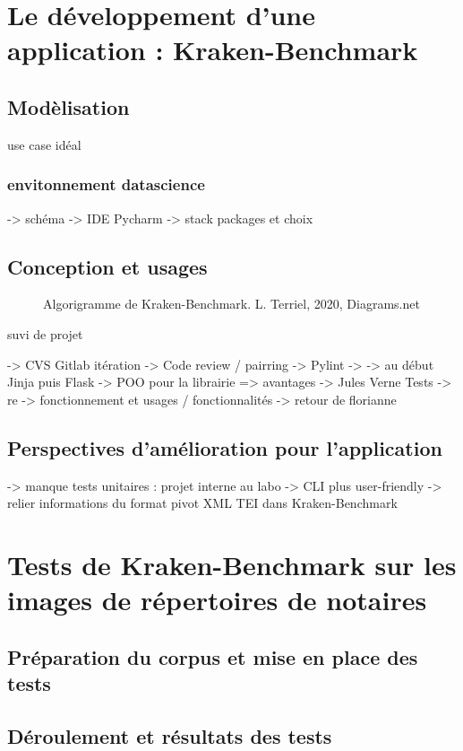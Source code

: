 \chapter{Le développement d'une application : Kraken-Benchmark}

\section{Modèlisation}

use case idéal

\subsection{envitonnement datascience}
-> schéma
-> IDE Pycharm
-> stack packages et choix

\section{Conception et usages}

\newpage
\begin{figure}
    \centering
    \centerline{}
    \caption{Algorigramme de Kraken-Benchmark.   \textcopyright L. Terriel, 2020, Diagrams.net}
    \label{fig:generateur_tei}
\end{figure}
suvi de projet

-> CVS Gitlab itération 
-> Code review / pairring 
-> Pylint -> 
-> au début Jinja puis Flask 
-> POO pour la librairie => avantages
-> Jules Verne Tests 
-> re
-> fonctionnement et usages / fonctionnalités 
-> retour de florianne 
\section{Perspectives d'amélioration pour l'application}
-> manque tests unitaires : projet interne au labo 
-> CLI plus user-friendly 
-> relier informations du format pivot XML TEI dans Kraken-Benchmark 

\chapter{Tests de Kraken-Benchmark sur les images de répertoires de notaires}
\section{Préparation du corpus et mise en place des tests}
\section{Déroulement et résultats des tests}

